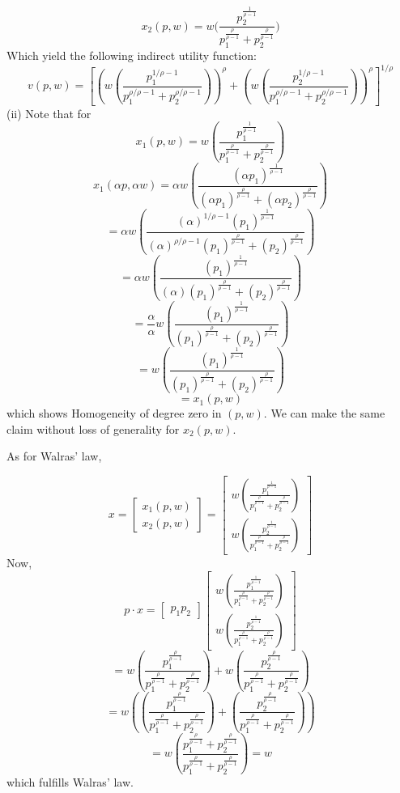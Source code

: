 \documentclass[letterpaper,12pt]{article}
\theoremstyle{definition}
\begin{document}
\[ x_2(p,w) = w \Big( \frac{p_2^{\frac{1}{\rho-1}}}{p_1^{\frac{\rho}{\rho-1}} + p_2^{\frac{\rho}{\rho-1}}} \Big)\]
Which yield the following indirect utility function:
\[ v(p,w) = \left[ \left( w \left( \frac{p_1^{1/\rho-1}}{p_1^{\rho/\rho-1} + p_2^{\rho/\rho-1}} \right) \right)^\rho + \left( w \left( \frac{p_2^{1/\rho-1}}{p_1^{\rho/\rho-1} + p_2^{\rho/\rho-1}} \right) \right)^\rho \right]^{1/\rho}\]
(ii)
Note that for
\[ x_1(p,w) = w \left( \frac{p_1^{\frac{1}{\rho-1}}}{p_1^{\frac{\rho}{\rho-1}} + p_2^{\frac{\rho}{\rho-1}}} \right)\]
\[ x_1(\alpha p,\alpha w) =\alpha w \left( \frac{(\alpha p_1)^{\frac{1}{\rho-1}}}{(\alpha p_1)^{\frac{\rho}{\rho-1}} + (\alpha p_2)^{\frac{\rho}{\rho-1}}} \right)\]
\[ =\alpha w \left( \frac{(\alpha)^{1/\rho-1} (p_1)^{\frac{1}{\rho-1}}}{(\alpha)^{\rho/\rho-1}(p_1)^{\frac{\rho}{\rho-1}} + (p_2)^{\frac{\rho}{\rho-1}}} \right)\]
\[ =\alpha w \left( \frac{ (p_1)^{\frac{1}{\rho-1}}}{(\alpha)(p_1)^{\frac{\rho}{\rho-1}} + (p_2)^{\frac{\rho}{\rho-1}}} \right)\]
\[ =\frac{\alpha}{\alpha} w \left( \frac{ (p_1)^{\frac{1}{\rho-1}}}{(p_1)^{\frac{\rho}{\rho-1}} + (p_2)^{\frac{\rho}{\rho-1}}} \right)\]
\[ = w\left( \frac{ (p_1)^{\frac{1}{\rho-1}}}{(p_1)^{\frac{\rho}{\rho-1}} + (p_2)^{\frac{\rho}{\rho-1}}} \right)\]
\[ = x_1(p,w) \]
which shows Homogeneity of degree zero in $(p,w)$. We can make the same claim without loss of generality for $x_2(p,w)$.

As for Walras' law, 

\[ 
x = 
\begin{bmatrix}
x_1(p,w)\\
x_2(p,w) 
\end{bmatrix}
=
\begin{bmatrix}
w \left( \frac{p_1^{\frac{1}{\rho-1}}}{p_1^{\frac{\rho}{\rho-1}} + p_2^{\frac{\rho}{\rho-1}}} \right)\\
w \left( \frac{p_2^{\frac{1}{\rho-1}}}{p_1^{\frac{\rho}{\rho-1}} + p_2^{\frac{\rho}{\rho-1}}} \right)
\end{bmatrix}
\]
Now, 
\[ p \cdot x = 
\begin{bmatrix}
    p_1
    p_2
\end{bmatrix}
\begin{bmatrix}
w \left( \frac{p_1^{\frac{1}{\rho-1}}}{p_1^{\frac{\rho}{\rho-1}} + p_2^{\frac{\rho}{\rho-1}}} \right)\\
w \left( \frac{p_2^{\frac{1}{\rho-1}}}{p_1^{\frac{\rho}{\rho-1}} + p_2^{\frac{\rho}{\rho-1}}} \right)
\end{bmatrix}
 \]\[
=
w \left( \frac{p_1^{\frac{\rho}{\rho-1}}}{p_1^{\frac{\rho}{\rho-1}} + p_2^{\frac{\rho}{\rho-1}}} \right) + 
w \left( \frac{p_2^{\frac{\rho}{\rho-1}}}{p_1^{\frac{\rho}{\rho-1}} + p_2^{\frac{\rho}{\rho-1}}} \right)
 \]\[
=
w \left(\left( \frac{p_1^{\frac{\rho}{\rho-1}}}{p_1^{\frac{\rho}{\rho-1}} + p_2^{\frac{\rho}{\rho-1}}} \right) + 
 \left( \frac{p_2^{\frac{\rho}{\rho-1}}}{p_1^{\frac{\rho}{\rho-1}} + p_2^{\frac{\rho}{\rho-1}}} \right)\right)
 \]\[
=
w \left( \frac{p_1^{\frac{\rho}{\rho-1}} + 
 p_2^{\frac{\rho}{\rho-1}}}{p_1^{\frac{\rho}{\rho-1}} + p_2^{\frac{\rho}{\rho-1}}} \right)
 = w
\]
which fulfills Walras' law.
\end{document}
